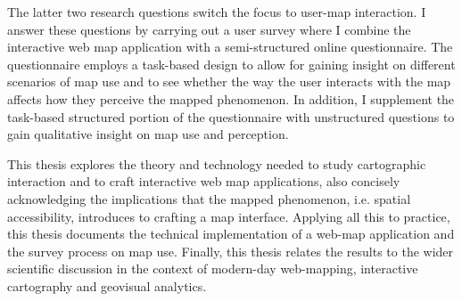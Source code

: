 The latter two research questions switch the focus to user-map interaction.
I answer these questions by carrying out a user survey
where I combine the interactive web map application with
a semi-structured online questionnaire.
The questionnaire employs a task-based design
to allow for gaining insight on different scenarios of map use
and to see whether the way the user interacts with the map
affects how they perceive the mapped phenomenon.
In addition, I supplement the task-based structured portion of the questionnaire
with unstructured questions to gain qualitative insight on map use and perception.

This thesis explores the theory and technology
needed to study cartographic interaction and to craft interactive web map applications,
also concisely acknowledging the implications that the mapped phenomenon,
i.e. spatial accessibility, introduces to crafting a map interface.
Applying all this to practice, this thesis documents the technical implementation
of a web-map application and the survey process on map use.
Finally, this thesis relates the results to the wider scientific discussion
in the context of modern-day web-mapping, interactive cartography and geovisual analytics. 




